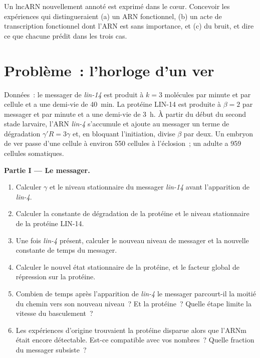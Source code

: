 \begin{exercise}[$\star\star\star$]\label{exo:b3:rna-regulation:12}
Un lncARN nouvellement annoté est exprimé dans le cœur. Concevoir les
expériences qui distingueraient (a) un ARN fonctionnel, (b) un acte de
transcription fonctionnel dont l'ARN est sans importance, et (c) du
bruit, et dire ce que chacune prédit dans les trois cas.
\end{exercise}

\section{Problème~: l'horloge d'un ver}

\begin{problem}
\label{pb:b3:rna-regulation:1}
Données~: le messager de \emph{lin-14} est produit à $k = 3$ molécules
par minute et par cellule et a une demi-vie de \qty{40}{min}. La
protéine LIN-14 est produite à $\beta = 2$ par messager et par minute
et a une demi-vie de \qty{3}{h}. À partir du début du second stade
larvaire, l'ARN \emph{lin-4} s'accumule et ajoute au messager un terme
de dégradation $\gamma' R = 3\gamma$ et, en bloquant l'initiation,
divise $\beta$ par deux. Un embryon de ver passe d'une cellule à
environ \num{550} cellules à l'éclosion~; un adulte a \num{959}
cellules somatiques.

\medskip
\noindent\textbf{Partie I --- Le messager.}
\begin{enumerate}
  \item Calculer $\gamma$ et le niveau stationnaire du messager
        \emph{lin-14} avant l'apparition de \emph{lin-4}.
  \item Calculer la constante de dégradation de la protéine et le
        niveau stationnaire de la protéine LIN-14.
  \item Une fois \emph{lin-4} présent, calculer le nouveau niveau de
        messager et la nouvelle constante de temps du messager.
  \item Calculer le nouvel état stationnaire de la protéine, et le
        facteur global de répression sur la protéine.
  \item Combien de temps après l'apparition de \emph{lin-4} le messager
        parcourt-il la moitié du chemin vers son nouveau niveau~? Et la
        protéine~? Quelle étape limite la vitesse du basculement~?
  \item Les expériences d'origine trouvaient la protéine disparue alors
        que l'ARNm était encore détectable. Est-ce compatible avec vos
        nombres~? Quelle fraction du messager subsiste~?
\end{enumerate}


\end{problem}
